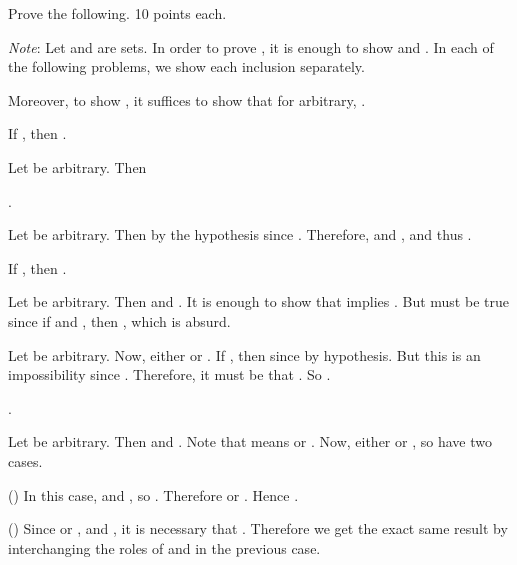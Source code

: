 				\stopsolution
		\stopitemize
	\stopexercise
\stopexercises


\startexercises [title={\getvariable{document}{author}  \hfill  \getvariable{document}{course}: Prelim  \hfill  2019-10-08}]

	\startexercise [title={Set Theory}]
		Prove the following. 10 points each.

		\emph{Note}: Let  and  are sets. In order to prove , it is enough to show  and . In each of the following problems, we show each inclusion separately.

		Moreover, to show , it suffices to show that for  arbitrary, .

		\startitemize [i]
			\item  If , then .

				\startsolution
					\startitemize
						
						  \qquad
							Let  be arbitrary. Then

							.

						  \qquad
							Let  be arbitrary. Then by the hypothesis  since . Therefore,  and , and thus .
					\stopitemize
				\stopsolution

			\item  If , then .

				\startsolution
					\startitemize
						
						  \qquad
							Let  be arbitrary. Then  and . It is enough to show that  implies . But must be true since if  and , then , which is absurd.

						  \qquad
							Let  be arbitrary. Now, either \m{x ∈ B} or . If , then  since  by hypothesis. But this is an impossibility since . Therefore, it must be that . So .
					\stopitemize
				\stopsolution
				
			\item  {}.

				\startsolution
					\startitemize
						
						  \qquad
							Let  be arbitrary. Then  and \m{x ∈ B ∪ C}. Note that  means  or .
							Now, either  or , so have two cases.
							\startitemize [1]
								\item  ()  \qquad
									In this case,  and , so \m{x ∈ A ∩ B}. Therefore  or . Hence .
								\item  ()  \qquad
									Since  or \m{x ∈ C}, and , it is necessary that . Therefore we get the exact same result by interchanging the roles of  and  in the previous case.
							\stopitemize

